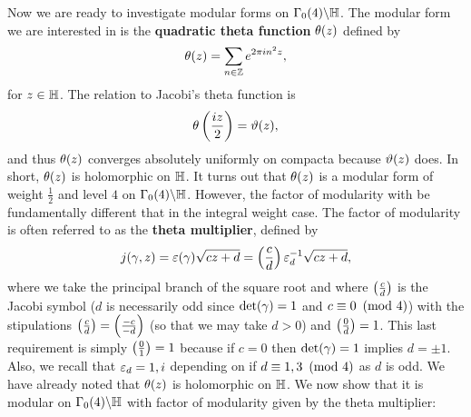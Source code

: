 \documentclass[12pt,oneside]{book}
\begin{document}
      Now we are ready to investigate modular forms on $\Gamma_{0}(4)\backslash\mathbb{H}$. The modular form we are interested in is the \textbf{quadratic theta function} $\theta(z)$ defined by
      \[
          \theta(z) = \sum_{n \in \mathbb{Z}}e^{2\pi in^{2}z},
      \]
      for $z \in \mathbb{H}$. The relation to Jacobi's theta function is
      \begin{equation}\label{equ:Jacobi_theta_relation}
          \theta\left(\frac{iz}{2}\right) = \vartheta(z),
      \end{equation}
      and thus $\theta(z)$ converges absolutely uniformly on compacta because $\vartheta(z)$ does. In short, $\theta(z)$ is holomorphic on $\mathbb{H}$. It turns out that $\theta(z)$ is a modular form of weight $\frac{1}{2}$ and level $4$ on $\Gamma_{0}(4)\backslash\mathbb{H}$. However, the factor of modularity with be fundamentally different that in the integral weight case. The factor of modularity is often referred to as the \textbf{theta multiplier}, defined by
      \[
          j(\gamma,z) = \varepsilon(\gamma)\sqrt{cz+d} = \left(\frac{c}{d}\right)\varepsilon_{d}^{-1}\sqrt{cz+d},
      \]
      where we take the principal branch of the square root and where $\left(\frac{c}{d}\right)$ is the Jacobi symbol ($d$ is necessarily odd since $\det(\gamma) = 1$ and $c \equiv 0 \ \left(\text{mod }4\right)$) with the stipulations $\left(\frac{c}{d}\right) = \left(\frac{-c}{-d}\right)$ (so that we may take $d > 0$) and $\left(\frac{0}{d}\right) = 1$. This last requirement is simply $\left(\frac{0}{1}\right) = 1$ because if $c = 0$ then $\det(\gamma) = 1$ implies $d = \pm 1$. Also, we recall that $\varepsilon_{d} = 1,i$ depending on if $d \equiv 1,3 \ \left(\text{mod }4\right)$ as $d$ is odd. We have already noted that $\theta(z)$ is holomorphic on $\mathbb{H}$. We now show that it is modular on $\Gamma_{0}(4)\backslash\mathbb{H}$ with factor of modularity given by the theta multiplier:
\end{document}
